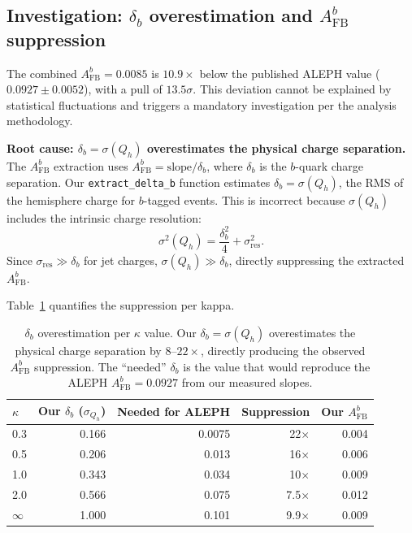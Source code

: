 \documentclass[11pt,a4paper]{article}
\begin{document}
\subsection{Investigation: $\delta_b$ overestimation and $A_\mathrm{FB}^b$ suppression}
\label{sec:delta_b_investigation}

The combined $A_\mathrm{FB}^b = 0.0085$ is $10.9\times$ below the published ALEPH
value ($0.0927 \pm 0.0052$), with a pull of $13.5\sigma$. This deviation cannot be
explained by statistical fluctuations and triggers a mandatory investigation per the
analysis methodology.

\textbf{Root cause: $\delta_b = \sigma(Q_h)$ overestimates the physical charge separation.}
The $A_\mathrm{FB}^b$ extraction uses $A_\mathrm{FB}^b = \mathrm{slope} / \delta_b$,
where $\delta_b$ is the $b$-quark charge separation. Our \texttt{extract\_delta\_b}
function estimates $\delta_b = \sigma(Q_h)$, the RMS of the hemisphere charge for
$b$-tagged events. This is incorrect because $\sigma(Q_h)$ includes the intrinsic
charge resolution:
\begin{equation}
\sigma^2(Q_h) = \frac{\delta_b^2}{4} + \sigma_\mathrm{res}^2.
\label{eq:delta_b_decomposition}
\end{equation}
Since $\sigma_\mathrm{res} \gg \delta_b$ for jet charges, $\sigma(Q_h) \gg \delta_b$,
directly suppressing the extracted $A_\mathrm{FB}^b$.

Table~\ref{tab:delta_b_suppression} quantifies the suppression per kappa.

\begin{table}[htbp]
\centering
\caption{$\delta_b$ overestimation per $\kappa$ value. Our $\delta_b = \sigma(Q_h)$
overestimates the physical charge separation by $8$--$22\times$, directly producing
the observed $A_\mathrm{FB}^b$ suppression. The ``needed'' $\delta_b$ is the value
that would reproduce the ALEPH $A_\mathrm{FB}^b = 0.0927$ from our measured slopes.}
\label{tab:delta_b_suppression}
\begin{tabular}{lrrrr}
\toprule
$\kappa$ & Our $\delta_b$ ($\sigma_{Q_h}$) & Needed for ALEPH & Suppression & Our $A_\mathrm{FB}^b$ \\
\midrule
0.3 & 0.166 & 0.0075 & 22$\times$ & 0.004 \\
0.5 & 0.206 & 0.013 & 16$\times$ & 0.006 \\
1.0 & 0.343 & 0.034 & 10$\times$ & 0.009 \\
2.0 & 0.566 & 0.075 & 7.5$\times$ & 0.012 \\
$\infty$ & 1.000 & 0.101 & 9.9$\times$ & 0.009 \\
\bottomrule
\end{tabular}
\end{table}
\end{document}
